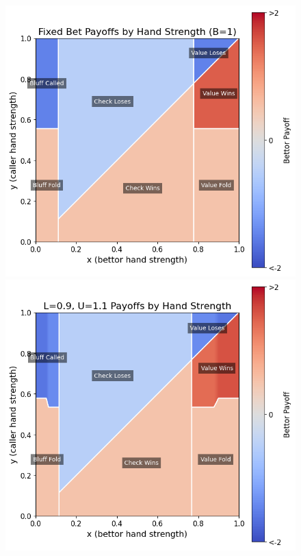 \documentclass[../../main/main.tex]{subfiles}
\begin{document}
\clearpage
{}
\begin{figure}[p]
    \begin{adjustwidth}{-1.25in}{-1.25in}
        \centering
        \begin{minipage}{0.4\textwidth}
            \centering
            \includegraphics[width=\textwidth]{images/payoffs_1_1.png}
        \end{minipage}
        \hspace{0.05\textwidth}
        \begin{minipage}{0.4\textwidth}
            \centering
            \includegraphics[width=\textwidth]{images/payoffs_0.9_1.1.png}

\end{minipage}
\end{adjustwidth}
\end{figure}
\end{document}

